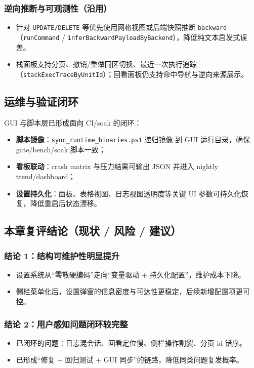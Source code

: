 \subsubsection{逆向推断与可观测性（沿用）}

\begin{itemize}
  \item 针对 \texttt{UPDATE/DELETE} 等优先使用网格视图或后端快照推断 \texttt{backward}（\texttt{runCommand} / \texttt{inferBackwardPayloadByBackend}），降低纯文本启发式误差。
  \item 栈面板支持分页、撤销/重做同区切换、最近一次执行追踪（\texttt{stackExecTraceByUnitId}）；回看面板仍支持命中导航与逆向来源展示。
\end{itemize}

\subsection{运维与验证闭环}

GUI 与脚本层已形成面向 CI/soak 的闭环：

\begin{itemize}
  \item \textbf{脚本镜像}：\texttt{sync\_runtime\_binaries.ps1} 递归镜像  到 GUI 运行目录，确保 gate/bench/soak 脚本一致；
  \item \textbf{看板联动}：crash matrix 与压力结果可输出 JSON 并进入 nightly trend/dashboard；
  \item \textbf{设置持久化}：面板、表格视图、日志视图透明度等关键 UI 参数可持久化恢复，降低重启后状态漂移。
\end{itemize}

\subsection{本章复评结论（现状 / 风险 / 建议）}

\subsubsection{结论 1：结构可维护性明显提升}
\begin{itemize}
  \item 设置系统从“零散硬编码”走向“变量驱动 + 持久化配置”，维护成本下降。
  \item 侧栏菜单化后，设置弹窗的信息密度与可达性更稳定，后续新增配置项更可控。
\end{itemize}

\subsubsection{结论 2：用户感知问题闭环较完整}
\begin{itemize}
  \item 已闭环的问题：日志混会话、回看定位慢、侧栏操作割裂、分页 id 错序。
  \item 已形成“修复 + 回归测试 + GUI 同步”的链路，降低同类问题复发概率。
\end{itemize}

